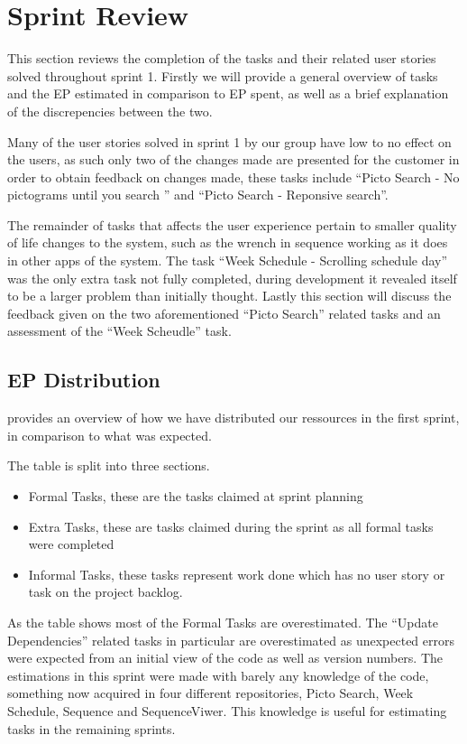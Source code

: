 \section{Sprint Review}\label{s1rev}
This section reviews the completion of the tasks and their related user stories solved throughout sprint 1.
Firstly we will provide a general overview of tasks and the EP estimated in comparison to EP spent, as well as a brief explanation of the discrepencies between the two.

Many of the user stories solved in sprint 1 by our group have low to no effect on the users, as such only two of the changes made are presented for the customer in order to obtain feedback on changes made, these tasks include ``Picto Search - No pictograms until you search '' and ``Picto Search - Reponsive search''.

The remainder of tasks that affects the user experience pertain to smaller quality of life changes to the system, such as the wrench in sequence working as it does in other apps of the system.
The task ``Week Schedule - Scrolling schedule day'' was the only extra task not fully completed, during development it revealed itself to be a larger problem than initially thought.
Lastly this section will discuss the feedback given on the two aforementioned ``Picto Search'' related tasks and an assessment of the ``Week Scheudle'' task.

\subsection{EP Distribution}
 provides an overview of how we have distributed our ressources in the first sprint, in comparison to what was expected.

The table is split into three sections.
\begin{itemize}
    \item Formal Tasks, these are the tasks claimed at sprint planning
    \item Extra Tasks, these are tasks claimed during the sprint as all formal tasks were completed
    \item Informal Tasks, these tasks represent work done which has no user story or task on the project backlog.
\end{itemize}
As the table shows most of the Formal Tasks are overestimated.
The ``Update Dependencies'' related tasks in particular are overestimated as unexpected errors were expected from an initial view of the code as well as version numbers.
The estimations in this sprint were made with barely any knowledge of the code, something now acquired in four different repositories, Picto Search, Week Schedule, Sequence and SequenceViwer.
This knowledge is useful for estimating tasks in the remaining sprints.

